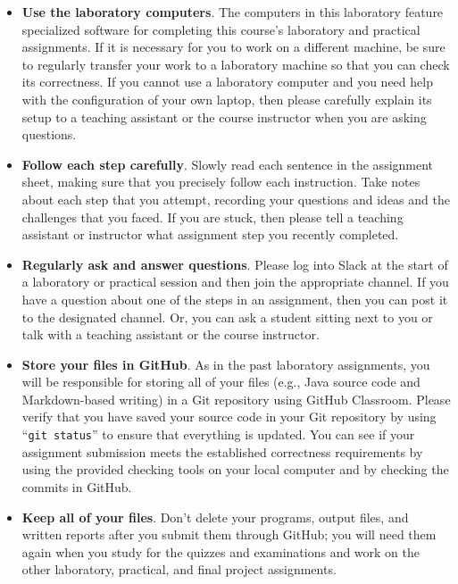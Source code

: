 \documentclass[11pt]{article}
\newcommand{\command}[1]{``\lstinline{#1}''}
\begin{document}
\begin{itemize}
  \setlength{\itemsep}{0pt}

\item {\bf Use the laboratory computers}. The computers in this laboratory
  feature specialized software for completing this course's laboratory and
  practical assignments. If it is necessary for you to work on a different
  machine, be sure to regularly transfer your work to a laboratory machine so
  that you can check its correctness. If you cannot use a laboratory computer
  and you need help with the configuration of your own laptop, then please
  carefully explain its setup to a teaching assistant or the course instructor
  when you are asking questions.

\item {\bf Follow each step carefully}. Slowly read each sentence in the
  assignment sheet, making sure that you precisely follow each instruction. Take
  notes about each step that you attempt, recording your questions and ideas and
  the challenges that you faced. If you are stuck, then please tell a teaching
  assistant or instructor what assignment step you recently completed.

\item {\bf Regularly ask and answer questions}. Please log into Slack at the
  start of a laboratory or practical session and then join the appropriate
  channel. If you have a question about one of the steps in an assignment, then
  you can post it to the designated channel. Or, you can ask a student sitting
  next to you or talk with a teaching assistant or the course instructor.

\item {\bf Store your files in GitHub}. As in the past laboratory assignments,
  you will be responsible for storing all of your files (e.g., Java source code
  and Markdown-based writing) in a Git repository using GitHub Classroom. Please
  verify that you have saved your source code in your Git repository by using
  \command{git status} to ensure that everything is updated. You can see if your
  assignment submission meets the established correctness requirements by using
  the provided checking tools on your local computer and by checking the commits
  in GitHub.

\item {\bf Keep all of your files}. Don't delete your programs, output files,
  and written reports after you submit them through GitHub; you will need them
  again when you study for the quizzes and examinations and work on the other
  laboratory, practical, and final project assignments.


\end{itemize}
\end{document}

